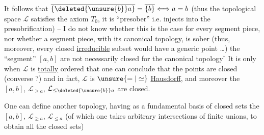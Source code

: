 It follows that $\overline{\{\deleted{\unsure{b}}a\}}=\overline{\{b\}}\Longleftrightarrow a=b$ (thus the topological space $\mathcal L$ satisfies the axiom $T_0$, it is ``presober'' i.e. injects into the presobrification) -- I do not know whether this is
the case for every segment piece, nor whether a segment piece, with its canonical topology, is sober (thus, moreover, every closed \uline{irreducible} subset would have a generic point \dots)
the ``segment'' $[a,b]$ are not necessarily closed for the canonical topology$^{\dagger}$
It is only when $\mathcal L$ is \uline{totally} ordered that one can conclude that the points are closed (converse ?) and in fact, $\mathcal L$ is $\unsure{=|\simeq}$ \uline{Hausdorff}, and moreover the $[a,b]$, $\mathcal L_{\geq a}$, $\mathcal L_{\leq\deleted{\unsure{b}}a}$ are closed.

One can define another topology, having as a fundamental basis of closed sets the $[a,b]$, $\mathcal L_{\geq a}$, $\mathcal L_{\leq a}$ (of which one takes arbitrary intersections of finite unions, to obtain all the closed sets)

